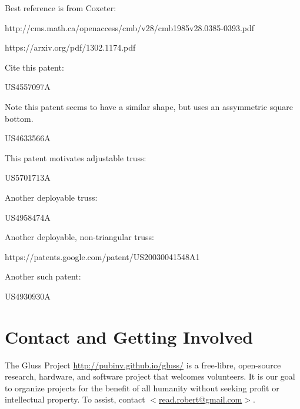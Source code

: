 \documentclass[11pt]{article}
\begin{document}
  Best reference is from Coxeter:
  
  http://cms.math.ca/openaccess/cmb/v28/cmb1985v28.0385-0393.pdf

https://arxiv.org/pdf/1302.1174.pdf

Cite this patent:


US4557097A

Note this patent seems to have a similar shape, but uses an assymmetric square bottom.

US4633566A

This patent motivates adjustable truss:

US5701713A

Another deployable truss:

US4958474A

Another deployable, non-triangular truss:

https://patents.google.com/patent/US20030041548A1


Another such patent:

US4930930A

\section{Contact and Getting Involved}

The Gluss Project \url{http://pubinv.github.io/gluss/}
is a free-libre, open-source research, hardware, and software project that welcomes volunteers.
It is our goal to organize projects for the benefit of all humanity without seeking profit or intellectual property.
To assist, contact \href{mailto:read.robert@gmail.com}{$<$read.robert@gmail.com$>$}.



\end{document}

